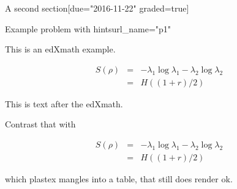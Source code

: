 \documentclass[12pt]{article}
\begin{document}
\begin{edXsection}{A second section}[due="2016-11-22" graded=true]

\begin{edXproblem}{Example problem with hints}{url_name="p1"}
 
This is an edXmath example.

\begin{edXmath}
\begin{eqnarray}
S(\rho) &=&  -\lambda_{1} \log \lambda_{1} -\lambda_{2} \log \lambda_{2} \\
        &=&  H((1+r)/2)
\end{eqnarray}
\end{edXmath}

This is text after the edXmath.

Contrast that with

\begin{eqnarray}
S(\rho) &=&  -\lambda_{1} \log \lambda_{1} -\lambda_{2} \log \lambda_{2} \\
        &=&  H((1+r)/2)
\end{eqnarray}

which plastex mangles into a table, that still does render ok.

\end{edXproblem}


\end{edXsection}

\end{document}
